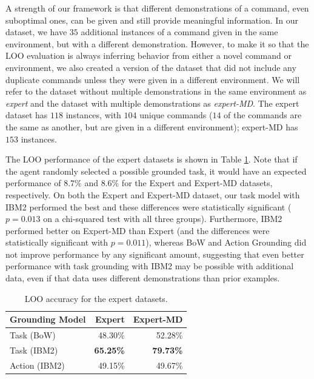\documentclass[conference]{IEEEtran}
\begin{document}
A strength of our framework is that different demonstrations of a command, even suboptimal ones, can be given and still provide meaningful information. In our dataset, we have $35$ additional instances of a command given in the same environment, but with a different demonstration. However, to make it so that the LOO evaluation is always inferring behavior from either a novel command or environment, we also created a version of the dataset that did not include any duplicate commands unless they were given in a different environment. We will refer to the dataset without multiple demonstrations in the same environment as {\em expert} and the dataset with multiple demonstrations as {\em expert-MD}. The expert dataset has $118$ instances, with $104$ unique commands ($14$ of the commands are the same as another, but are given in a different environment); expert-MD has $153$ instances. %

The LOO performance of the expert datasets is shown in Table \ref{tab:res_e}. Note that if the agent randomly selected a possible grounded task, it would have an expected performance of $8.7\%$ and $8.6\%$ for the Expert and Expert-MD datasets, respectively. On both the Expert and Expert-MD dataset, our task model with IBM2 performed the best and these differences were statistically significant ($p = 0.013$ on a chi-squared test with all three groups). Furthermore, IBM2 performed better on Expert-MD than Expert (and the differences were statistically significant with $p = 0.011$), whereas BoW and Action Grounding did not improve performance by any significant amount, suggesting that even better performance with task grounding with IBM2 may be possible with additional data, even if that data uses different demonstrations than prior examples. 


\begin{table}[tb]
\begin{center}
\begin{tabular}{@{}lrr@{}} \toprule
Grounding Model & Expert & Expert-MD \\ \midrule
Task (BoW) & 48.30\% & 52.28\% \\ 
Task (IBM2) & {\bf 65.25\%} & {\bf 79.73\%}  \\ 
Action (IBM2) & 49.15\% & 49.67\% \\ \bottomrule
\hline
 \end{tabular} 
 \caption{LOO accuracy for the expert datasets.}
 \label{tab:res_e}
\end{center}
\end{table}
\end{document}
